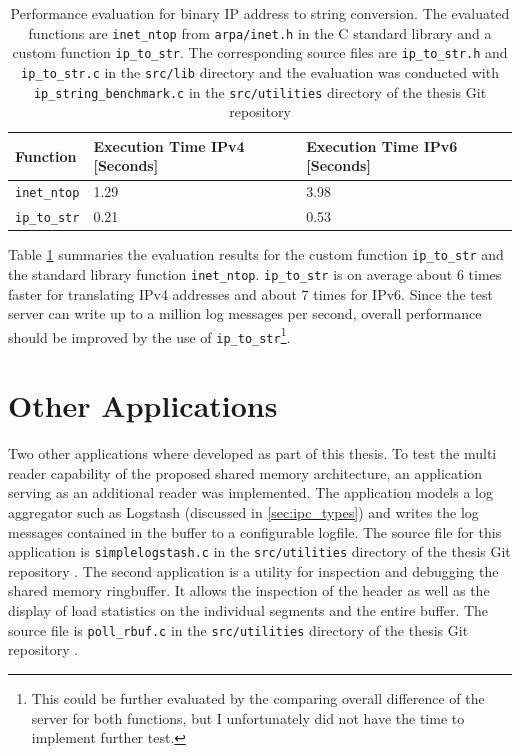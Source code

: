\begin{table}[h!]
    \label{tab:ip_str}
    \centering
    \small
    \begin{tabular}{lll}
        \toprule
        \textbf{Function} & \textbf{Execution Time IPv4 [Seconds]} & \textbf{Execution Time IPv6 [Seconds]} \\ \midrule 
        \texttt{inet\_ntop} & 1.29 & 3.98 \\ \midrule
        \texttt{ip\_to\_str} & 0.21 & 0.53 \\ 
        \bottomrule
    \end{tabular}
    \caption[IP String Conversion]{Performance evaluation for binary IP address to string conversion. The evaluated functions are
    \texttt{inet\_ntop} from \texttt{arpa/inet.h} in the C standard library and a custom function \texttt{ip\_to\_str}. The corresponding source 
    files are \texttt{ip\_to\_str.h}
    and \texttt{ip\_to\_str.c} in the \texttt{src/lib} directory and the evaluation was conducted with
    \texttt{ip\_string\_benchmark.c} in the \texttt{src/utilities} directory of the thesis Git repository \cite{gitlab}}
\end{table}

Table \ref{tab:ip_str} summaries the evaluation results for the custom function \texttt{ip\_to\_str} and the standard library function \texttt{inet\_ntop}. 
\texttt{ip\_to\_str} is on average about 6 times faster for translating \ac{IPv4} addresses and about 7 times for \ac{IPv6}. Since the test server
can write up to a million log messages per second, overall performance should be improved by the use of \texttt{ip\_to\_str}\footnote{This could be further evaluated by the comparing overall difference of the server for both functions, but I unfortunately did not have the time to implement further test.}. 

\section{Other Applications}

Two other applications where developed as part of this thesis. To test the multi reader capability of the proposed
shared memory architecture, an application serving as an additional reader was implemented. The application models a 
log aggregator such as Logstash (discussed in \ref{sec:ipc_types}) and writes the log messages contained in the buffer to a configurable 
logfile. The source file for this application is \texttt{simplelogstash.c} in the \texttt{src/utilities} directory of the thesis Git repository \cite{gitlab}.
The second application is a utility for inspection and debugging the shared memory ringbuffer. It allows the inspection of the header as well
as the display of load statistics on the individual segments and the entire buffer. The source file is \texttt{poll\_rbuf.c} in the \texttt{src/utilities} directory of the thesis Git repository \cite{gitlab}. 

